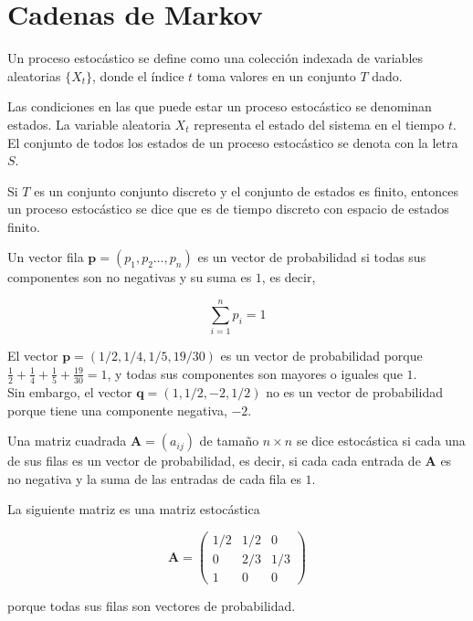 \chapter{Cadenas de Markov}

\begin{defi}
Un proceso estocástico se define como una colección indexada de variables aleatorias $\{X_t\}$, donde el índice $t$ toma valores en un conjunto $T$ dado.  
\end{defi}

\begin{defi}
Las condiciones en las que puede estar un proceso estocástico se denominan estados. La variable aleatoria $X_t$ representa el estado del sistema en el tiempo $t$. El conjunto de todos los estados de un proceso estocástico se denota con la letra $S$.
\end{defi}

\begin{defi}
Si $T$ es un conjunto conjunto discreto y el conjunto de estados es finito, entonces un proceso estocástico se dice que es de tiempo discreto con espacio de estados finito. 
\end{defi}

\begin{defi}
Un vector fila $\mathbf{p} = (p_1,p_2\dots,p_n)$ es un vector de probabilidad si todas sus componentes son no negativas y su suma es $1$, es decir,

\[ \sum\limits_{i=1}^{n} p_i = 1 \]
\end{defi}

\begin{ejemplo}
El vector $\mathbf{p} = (1/2, 1/4, 1/5, 19/30)$ es un vector de probabilidad porque $\frac{1}{2} + \frac{1}{4} + \frac{1}{5} + \frac{19}{30} = 1$, y todas sus componentes son mayores o iguales que $1$. \\
Sin embargo, el vector $\mathbf{q} = (1, 1/2, -2, 1/2)$ no es un vector de probabilidad porque tiene una componente negativa, $-2$.
\end{ejemplo}

\begin{defi}
Una matriz cuadrada $\mathbf{A} = (a_{ij})$ de tamaño $n \times n$ se dice estocástica si cada una de sus filas es un vector de probabilidad, es decir, si cada cada entrada de $\mathbf{A}$ es no negativa y la suma de las entradas de cada fila es $1$.
\end{defi}

\begin{ejemplo}
La siguiente matriz es una matriz estocástica 

\[\mathbf{A} = \left(\begin{array}{ccc}
1/2 & 1/2 & 0\\
0   & 2/3 & 1/3\\
1   &  0  & 0
\end{array}\right) \]

porque todas sus filas son vectores de probabilidad.
\end{ejemplo}

